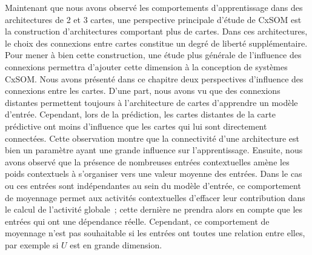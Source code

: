 \documentclass[../main]{subfiles}
\begin{document}
Maintenant que nous avons observé les comportements d'apprentissage dans des architectures de 2 et 3 cartes, une perspective principale d'étude de CxSOM est la construction d'architectures comportant plus de cartes.
Dans ces architectures, le choix des connexions entre cartes constitue un degré de liberté supplémentaire.
Pour mener à bien cette construction, une étude plus générale de l'influence des connexions permettra d'ajouter cette dimension à la conception de systèmes CxSOM.
Nous avons présenté dans ce chapitre deux perspectives d'influence des connexions entre les cartes.
D'une part, nous avons vu que des connexions distantes permettent toujours à l'architecture de cartes d'apprendre un modèle d'entrée. Cependant, lors de la prédiction, les cartes distantes de la carte prédictive ont moins d'influence que les cartes qui lui sont directement connectées. Cette observation montre que la connectivité d'une architecture est bien un paramètre ayant une grande influence sur l'apprentissage. 
Ensuite, nous avons observé que la présence de nombreuses entrées contextuelles amène les poids contextuels à s'organiser vers une valeur moyenne des entrées. Dans le cas ou ces entrées sont indépendantes au sein du modèle d'entrée, ce comportement de moyennage permet aux activités contextuelles d'effacer leur contribution dans le calcul de l'activité globale~; cette dernière ne prendra alors en compte que les entrées qui ont une dépendance réelle.
Cependant, ce comportement de moyennage n'est pas souhaitable si les entrées ont toutes une relation entre elles, par exemple si $U$ est en grande dimension.
\end{document}
